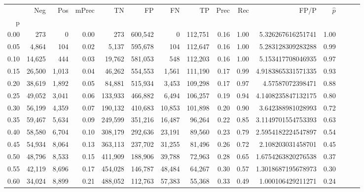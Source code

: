 \begin{tabular}{rrrrrrrrrrrrrrr}
\toprule
{} &     Neg &    Pos & mPrec &       TN &       FP &       FN &       TP &  Prec &   Rec &                  FP/P & $\hat{p}$ \\
p    &         &        &       &          &          &          &          &       &       &                       &           \\
\midrule
0.00 &     273 &      0 &  0.00 &      273 &  600,542 &        0 &  112,751 &  0.16 &  1.00 &     5.326267616251741 &      1.00 \\
0.05 &   4,864 &    104 &  0.02 &    5,137 &  595,678 &      104 &  112,647 &  0.16 &  1.00 &     5.283128309283288 &      0.99 \\
0.10 &  14,625 &    444 &  0.03 &   19,762 &  581,053 &      548 &  112,203 &  0.16 &  1.00 &     5.153417708046935 &      0.97 \\
0.15 &  26,500 &  1,013 &  0.04 &   46,262 &  554,553 &    1,561 &  111,190 &  0.17 &  0.99 &    4.9183865331571335 &      0.93 \\
0.20 &  38,619 &  1,892 &  0.05 &   84,881 &  515,934 &    3,453 &  109,298 &  0.17 &  0.97 &      4.57587072398471 &      0.88 \\
0.25 &  49,052 &  3,041 &  0.06 &  133,933 &  466,882 &    6,494 &  106,257 &  0.19 &  0.94 &    4.1408235847132175 &      0.80 \\
0.30 &  56,199 &  4,359 &  0.07 &  190,132 &  410,683 &   10,853 &  101,898 &  0.20 &  0.90 &     3.642388981028993 &      0.72 \\
0.35 &  59,467 &  5,634 &  0.09 &  249,599 &  351,216 &   16,487 &   96,264 &  0.22 &  0.85 &    3.1149701554753393 &      0.63 \\
0.40 &  58,580 &  6,704 &  0.10 &  308,179 &  292,636 &   23,191 &   89,560 &  0.23 &  0.79 &    2.5954182224547897 &      0.54 \\
0.45 &  54,934 &  8,064 &  0.13 &  363,113 &  237,702 &   31,255 &   81,496 &  0.26 &  0.72 &     2.108203031458701 &      0.45 \\
0.50 &  48,796 &  8,533 &  0.15 &  411,909 &  188,906 &   39,788 &   72,963 &  0.28 &  0.65 &    1.6754263820276538 &      0.37 \\
0.55 &  42,119 &  8,696 &  0.17 &  454,028 &  146,787 &   48,484 &   64,267 &  0.30 &  0.57 &    1.3018687195678973 &      0.30 \\
0.60 &  34,024 &  8,899 &  0.21 &  488,052 &  112,763 &   57,383 &   55,368 &  0.33 &  0.49 &     1.000106429211271 &      0.24 \\

\end{tabular}
